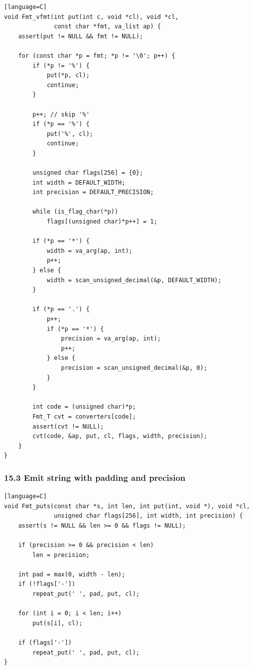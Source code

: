 \documentclass[11pt]{article}
\begin{document}
\begin{verbatim}[language=C]
void Fmt_vfmt(int put(int c, void *cl), void *cl,
              const char *fmt, va_list ap) {
    assert(put != NULL && fmt != NULL);

    for (const char *p = fmt; *p != '\0'; p++) {
        if (*p != '%') {
            put(*p, cl);
            continue;
        }

        p++; // skip '%'
        if (*p == '%') {
            put('%', cl);
            continue;
        }

        unsigned char flags[256] = {0};
        int width = DEFAULT_WIDTH;
        int precision = DEFAULT_PRECISION;

        while (is_flag_char(*p))
            flags[(unsigned char)*p++] = 1;

        if (*p == '*') {
            width = va_arg(ap, int);
            p++;
        } else {
            width = scan_unsigned_decimal(&p, DEFAULT_WIDTH);
        }

        if (*p == '.') {
            p++;
            if (*p == '*') {
                precision = va_arg(ap, int);
                p++;
            } else {
                precision = scan_unsigned_decimal(&p, 0);
            }
        }

        int code = (unsigned char)*p;
        Fmt_T cvt = converters[code];
        assert(cvt != NULL);
        cvt(code, &ap, put, cl, flags, width, precision);
    }
}
\end{verbatim}

\subsubsection{15.3 Emit string with padding and precision}\label{emit-string-with-padding-and-precision}

\begin{verbatim}[language=C]
void Fmt_puts(const char *s, int len, int put(int, void *), void *cl,
              unsigned char flags[256], int width, int precision) {
    assert(s != NULL && len >= 0 && flags != NULL);

    if (precision >= 0 && precision < len)
        len = precision;

    int pad = max(0, width - len);
    if (!flags['-'])
        repeat_put(' ', pad, put, cl);

    for (int i = 0; i < len; i++)
        put(s[i], cl);

    if (flags['-'])
        repeat_put(' ', pad, put, cl);
}
\end{verbatim}
\end{document}

